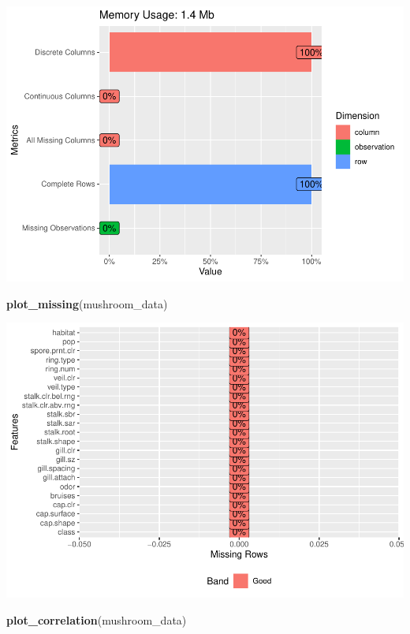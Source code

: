 \documentclass[
  english,
  man]{apa6}
\newenvironment{Shaded}{\begin{snugshade}}{\end{snugshade}}
\newcommand{\KeywordTok}[1]{\textcolor[rgb]{0.13,0.29,0.53}{\textbf{#1}}}
\newcommand{\NormalTok}[1]{#1}
\begin{document}
\includegraphics{Test_files/figure-latex/data exploration-1.pdf}

\begin{Shaded}
\begin{Highlighting}[]
\KeywordTok{plot_missing}\NormalTok{(mushroom_data)}
\end{Highlighting}
\end{Shaded}

\includegraphics{Test_files/figure-latex/data exploration-2.pdf}

\begin{Shaded}
\begin{Highlighting}[]
\KeywordTok{plot_correlation}\NormalTok{(mushroom_data)}
\end{Highlighting}
\end{Shaded}
\end{document}
